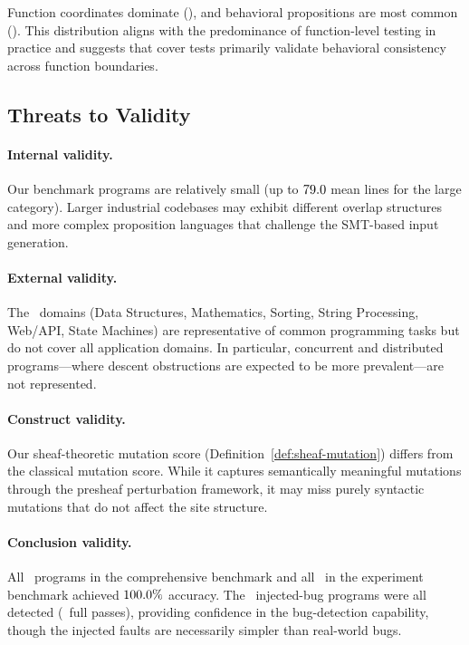 \documentclass[11pt]{article}
\begin{document}
Function coordinates dominate (\suppCoordFunctionPct), and behavioral
propositions are most common (\suppPropBehavioralPct).  This distribution
aligns with the predominance of function-level testing in practice and
suggests that cover tests primarily validate behavioral consistency across
function boundaries.

\subsection{Threats to Validity}

\paragraph{Internal validity.}
Our benchmark programs are relatively small (up to $79.0$
mean lines for the large category).  Larger industrial codebases may
exhibit different overlap structures and more complex proposition
languages that challenge the SMT-based input generation.

\paragraph{External validity.}
The \expDomainCount\ domains (Data Structures, Mathematics, Sorting,
String Processing, Web/API, State Machines) are representative of common
programming tasks but do not cover all application domains.  In particular,
concurrent and distributed programs---where descent obstructions are
expected to be more prevalent---are not represented.

\paragraph{Construct validity.}
Our sheaf-theoretic mutation score (Definition~\ref{def:sheaf-mutation})
differs from the classical mutation score.  While it captures
semantically meaningful mutations through the presheaf perturbation
framework, it may miss purely syntactic mutations that do not affect
the site structure.

\paragraph{Conclusion validity.}
All \compTotalPrograms\ programs in the comprehensive benchmark and all
\expTotalPrograms\ in the experiment benchmark achieved $100.0\%$
accuracy.  The \compBuggyCount\ injected-bug programs were all detected
(\compBuggyFullPass\ full passes), providing confidence in the
bug-detection capability, though the injected faults are necessarily
simpler than real-world bugs.
\end{document}
